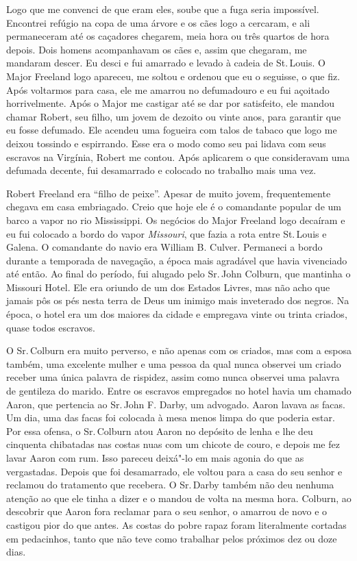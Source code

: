 Logo que me convenci de que eram eles, soube que a fuga seria
impossível. Encontrei refúgio na copa de uma árvore e os cães logo a
cercaram, e ali permaneceram até os caçadores chegarem, meia hora ou
três quartos de hora depois. Dois homens acompanhavam os cães e, assim
que chegaram, me mandaram descer. Eu desci e fui amarrado e levado à
cadeia de St.\,Louis. O Major Freeland logo apareceu, me soltou e ordenou
que eu o seguisse, o que fiz. Após voltarmos para casa, ele me amarrou
no defumadouro e eu fui açoitado horrivelmente. Após o Major me castigar
até se dar por satisfeito, ele mandou chamar Robert, seu filho, um jovem
de dezoito ou vinte anos, para garantir que eu fosse defumado. Ele
acendeu uma fogueira com talos de tabaco que logo me deixou tossindo e
espirrando. Esse era o modo como seu pai lidava com seus escravos na
Virgínia, Robert me contou. Após aplicarem o que consideravam uma
defumada decente, fui desamarrado e colocado no trabalho mais uma vez.

Robert Freeland era ``filho de peixe''. Apesar de muito jovem,
frequentemente chegava em casa embriagado. Creio que hoje ele é o
comandante popular de um barco a vapor no rio Mississippi. Os negócios
do Major Freeland logo decaíram e eu fui colocado a bordo do vapor
\emph{Missouri}, que fazia a rota entre St.\,Louis e Galena. O comandante
do navio era William B. Culver. Permaneci a bordo durante a temporada de
navegação, a época mais agradável que havia vivenciado até então. Ao
final do período, fui alugado pelo Sr.\,John Colburn, que mantinha o
Missouri Hotel. Ele era oriundo de um dos Estados Livres, mas não acho
que jamais pôs os pés nesta terra de Deus um inimigo mais inveterado dos
negros. Na época, o hotel era um dos maiores da cidade e empregava vinte
ou trinta criados, quase todos escravos.

O Sr.\,Colburn era muito perverso, e não apenas com os criados, mas com a
esposa também, uma excelente mulher e uma pessoa da qual nunca observei
um criado receber uma única palavra de rispidez, assim como nunca
observei uma palavra de gentileza do marido. Entre os escravos
empregados no hotel havia um chamado Aaron, que pertencia ao Sr.\,John F.
Darby, um advogado. Aaron lavava as facas. Um dia, uma das facas foi
colocada à mesa menos limpa do que poderia estar. Por essa ofensa, o Sr.\,Colburn atou Aaron no depósito de lenha e lhe deu cinquenta chibatadas
nas costas nuas com um chicote de couro, e depois me fez lavar Aaron com
rum. Isso pareceu deixá"-lo em mais agonia do que as vergastadas. Depois
que foi desamarrado, ele voltou para a casa do seu senhor e reclamou do
tratamento que recebera. O Sr.\,Darby também não deu nenhuma atenção ao
que ele tinha a dizer e o mandou de volta na mesma hora. Colburn, ao
descobrir que Aaron fora reclamar para o seu senhor, o amarrou de novo e
o castigou pior do que antes. As costas do pobre rapaz foram
literalmente cortadas em pedacinhos, tanto que não teve como trabalhar
pelos próximos dez ou doze dias.

